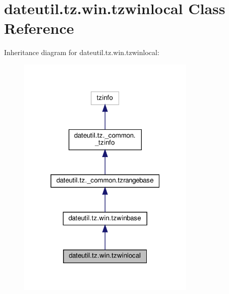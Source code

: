 \hypertarget{classdateutil_1_1tz_1_1win_1_1tzwinlocal}{}\section{dateutil.\+tz.\+win.\+tzwinlocal Class Reference}
\label{classdateutil_1_1tz_1_1win_1_1tzwinlocal}


Inheritance diagram for dateutil.\+tz.\+win.\+tzwinlocal\+:
\nopagebreak
\begin{figure}[H]
\begin{center}
\leavevmode
\includegraphics[width=241pt]{classdateutil_1_1tz_1_1win_1_1tzwinlocal__inherit__graph}
\end{center}
\end{figure}


